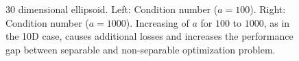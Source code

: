 \begin{figure}[h!]
\begin{minipage}[b]{0.5\linewidth}
 \centering
\end{minipage}
\begin{minipage}[b]{0.5\linewidth}
 \centering
\end{minipage}
\caption{30 dimensional ellipsoid. Left: Condition number ($a=100$).  Right: Condition number ($a=1000$). Increasing of $a$ for $100$ to $1000$, as in the 10D case, causes additional losses and increases the performance gap between separable and non-separable optimization problem.} 

\label{ellipse_t2}
\end{figure}

